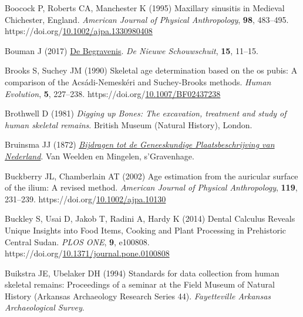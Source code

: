 \documentclass[
  11pt,
  leqno]{scrartcl}
\newlength{\cslhangindent}
\newenvironment{CSLReferences}[2] %
 {\begin{list}{}{%
  \setlength{\itemindent}{0pt}
  \setlength{\leftmargin}{0pt}
  \setlength{\parsep}{0pt}
  \ifodd #1
   \setlength{\leftmargin}{\cslhangindent}
   \setlength{\itemindent}{-1\cslhangindent}
  \fi
  \setlength{\itemsep}{#2\baselineskip}}}
 {\end{list}}
\begin{document}
\begin{CSLReferences}{1}{0}
Boocock P, Roberts CA, Manchester K (1995) Maxillary sinusitis in
{Medieval Chichester}, {England}. \emph{American Journal of Physical
Anthropology}, \textbf{98}, 483--495.
https://doi.org/\href{https://doi.org/10.1002/ajpa.1330980408}{10.1002/ajpa.1330980408}

Bouman J (2017)
\href{https://www.historischgenootschapbeemster.nl/wp-content/uploads/De_Nieuwe_Schouwschuit_15e_jaargang_november_2017.pdf}{De
Begravenis}. \emph{De Nieuwe Schouwschuit}, \textbf{15}, 11--15.

Brooks S, Suchey JM (1990) Skeletal age determination based on the os
pubis: {A} comparison of the {Acsádi-Nemeskéri} and {Suchey-Brooks}
methods. \emph{Human Evolution}, \textbf{5}, 227--238.
https://doi.org/\href{https://doi.org/10.1007/BF02437238}{10.1007/BF02437238}

Brothwell D (1981) \emph{Digging up {Bones}: {The} excavation, treatment
and study of human skeletal remains}. {British Museum (Natural
History)}, {London}.

Bruinsma JJ (1872)
\emph{\href{https://dlcs.io/pdf/wellcome/pdf-item/b24874140/0}{Bijdragen
tot de {Geneeskundige Plaatsbeschrijving} van {Nederland}}}. {Van
Weelden en Mingelen}, {s'Gravenhage}.

Buckberry JL, Chamberlain AT (2002) Age estimation from the auricular
surface of the ilium: A revised method. \emph{American Journal of
Physical Anthropology}, \textbf{119}, 231--239.
https://doi.org/\href{https://doi.org/10.1002/ajpa.10130}{10.1002/ajpa.10130}

Buckley S, Usai D, Jakob T, Radini A, Hardy K (2014) Dental {Calculus
Reveals Unique Insights} into {Food Items}, {Cooking} and {Plant
Processing} in {Prehistoric Central Sudan}. \emph{PLOS ONE}, \textbf{9},
e100808.
https://doi.org/\href{https://doi.org/10.1371/journal.pone.0100808}{10.1371/journal.pone.0100808}

Buikstra JE, Ubelaker DH (1994) Standards for data collection from human
skeletal remains: {Proceedings} of a seminar at the {Field Museum} of
{Natural History} ({Arkansas Archaeology Research Series} 44).
\emph{Fayetteville Arkansas Archaeological Survey}.


\end{CSLReferences}
\end{document}
